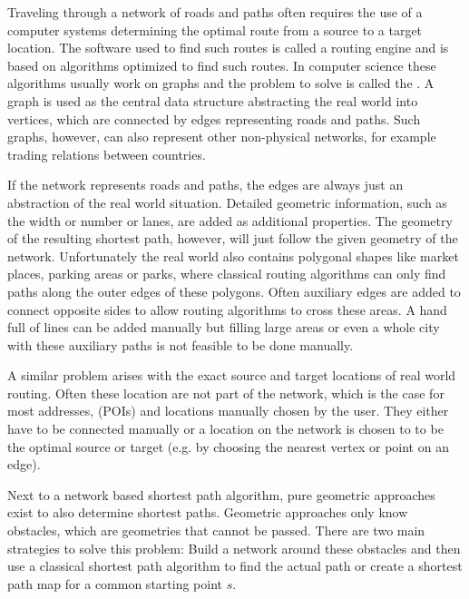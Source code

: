 
Traveling through a network of roads and paths often requires the use of a computer systems determining the optimal route from a source to a target location.
The software used to find such routes is called a routing engine and is based on algorithms optimized to find such routes.
In computer science these algorithms usually work on graphs and the problem to solve is called the .
A graph is used as the central data structure abstracting the real world into vertices, which are connected by edges representing roads and paths.
Such graphs, however, can also represent other non-physical networks, for example trading relations between countries\citationNeeded.

If the network represents roads and paths, the edges are always just an abstraction of the real world situation.
Detailed geometric information, such as the width or number or lanes, are added as additional properties.
The geometry of the resulting shortest path, however, will just follow the given geometry of the network.
Unfortunately the real world also contains polygonal shapes like market places, parking areas or parks, where classical routing algorithms can only find paths along the outer edges of these polygons.
Often auxiliary edges are added to connect opposite sides to allow routing algorithms to cross these areas.
A hand full of lines can be added manually but filling large areas or even a whole city with these auxiliary paths is not feasible to be done manually.

A similar problem arises with the exact source and target locations of real world routing.
Often these location are not part of the network, which is the case for most addresses,  (POIs) and locations manually chosen by the user.
They either have to be connected manually or a location on the network is chosen to to be the optimal source or target (e.g. by choosing the nearest  vertex or point on an edge).

Next to a network based shortest path algorithm, pure geometric approaches exist to also determine shortest paths.
Geometric approaches only know obstacles, which are geometries that cannot be passed.
There are two main strategies to solve this problem\cite[2]{hershberger-suri}:
Build a network around these obstacles and then use a classical shortest path algorithm to find the actual path or create a shortest path map for a common starting point $s$.

